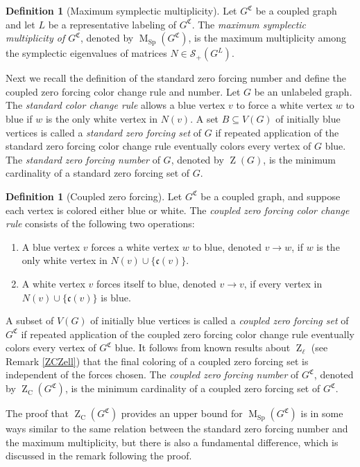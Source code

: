 \documentclass[12pt]{article}
\theoremstyle{definition}
\theoremstyle{definition}
\newtheorem{defn}[thm]{Definition}
\theoremstyle{definition}
\numberwithin{figure}{section}
\numberwithin{equation}{section}
\newcommand{\GC}[2]{#1 ^ {\mathfrak #2}}
\newcommand{\pp}{\mathfrak{c}}
\newcommand{\symp}{\mathcal{S}_+}
\newcommand{\Z}{\operatorname{Z}}
\newcommand{\ZC}{\Z_{\operatorname{C}}}
\newcommand{\M}{\operatorname{M}}
\newcommand{\MC}{\M_{\operatorname{Sp}}}
\begin{document}
\begin{defn}[Maximum symplectic multiplicity]
    Let $\GC G C$ be a coupled graph  and let $L$ be a representative labeling of $\GC G C$.  The \emph{maximum symplectic multiplicity of $\GC G C$}, denoted by $\MC(\GC G C )$, is the maximum multiplicity among the symplectic eigenvalues of matrices $N\in\symp(G^L)$. 
\end{defn}

Next we recall the definition of the standard zero forcing number and define the coupled zero forcing color change rule and number. Let $G$ be an unlabeled graph. The \emph{standard color change   rule} allows a blue vertex $v$ to force a white vertex $w$ to blue if $w$ is the only white vertex in $N(v)$. 
A set $B\subseteq V(G)$ of initially blue vertices is called a \emph{standard zero forcing set} of $G$ if repeated application of the standard zero forcing color change rule eventually colors every vertex of $G$ blue. The \emph{standard zero forcing number} of $G$, denoted by $\Z(G)$, is the minimum cardinality of a standard zero forcing set of $G$. 


\begin{defn}[Coupled zero forcing] 
Let $\GC G C$ be a coupled graph, and suppose each vertex is colored either blue or white. The \emph{coupled zero forcing color change rule} consists of the following two operations:
\begin{enumerate}
    \item A blue vertex $v$ forces a white vertex $w$ to blue, denoted $v\to w$, if $w$ is the only white vertex in $N(v)\cup \{\pp(v)\}$.
    \item A white vertex $v$ forces itself to blue, denoted $v\to v$, if every vertex in $N(v)\cup \{\pp(v)\}$ is blue. 
\end{enumerate}
 A subset of  $V(G)$ of initially blue vertices is called a \emph{coupled zero forcing set} of $\GC G C$ if repeated application of the coupled zero forcing color change rule eventually colors every vertex of $\GC G C$ blue. It follows from known results about $\Z_\ell$ (see Remark \ref{ZCZell}) that the final coloring of a coupled zero forcing set is independent of the forces chosen. The \emph{coupled zero forcing number} of $\GC G C$, denoted by $\ZC(\GC G C)$, is the minimum cardinality of a coupled zero forcing set of $\GC G C$. 
\end{defn}


   The proof that $\ZC(\GC G C)$ provides an upper bound for $\MC(\GC G C)$   is  in some ways similar to the same relation between the standard zero forcing number and the maximum multiplicity, but there is also a fundamental difference, which is discussed in the remark following the proof. 
\end{document}
